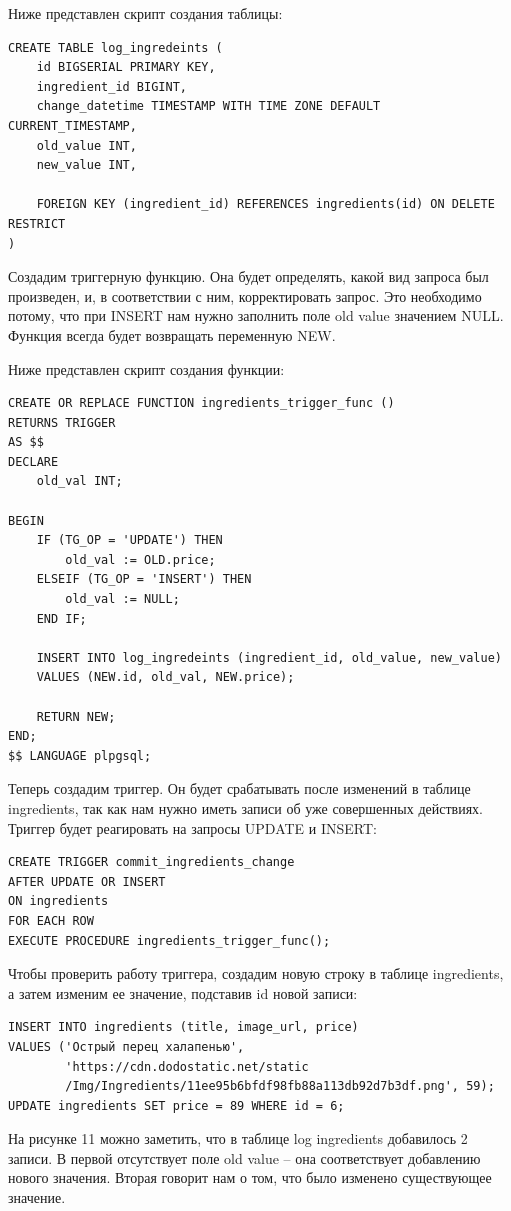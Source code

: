 \documentclass[a4paper,14pt]{extarticle}
\begin{document}
  Ниже представлен скрипт создания таблицы:
  
  \noindent
  \begin{Verbatim}[tabsize=4,fontsize=\small]
CREATE TABLE log_ingredeints (
    id BIGSERIAL PRIMARY KEY,
    ingredient_id BIGINT,
    change_datetime TIMESTAMP WITH TIME ZONE DEFAULT CURRENT_TIMESTAMP,
    old_value INT,
    new_value INT,

    FOREIGN KEY (ingredient_id) REFERENCES ingredients(id) ON DELETE RESTRICT
)
  \end{Verbatim}

  Создадим триггерную функцию. Она будет определять, какой вид запроса был произведен, и, в соответствии с ним, корректировать запрос. Это необходимо потому, что при INSERT нам нужно заполнить поле old value значением NULL. Функция всегда будет возвращать переменную NEW.

  Ниже представлен скрипт создания функции:

  \noindent
  \begin{Verbatim}[tabsize=4,fontsize=\small]
CREATE OR REPLACE FUNCTION ingredients_trigger_func ()
RETURNS TRIGGER
AS $$
DECLARE
    old_val INT;

BEGIN
    IF (TG_OP = 'UPDATE') THEN
        old_val := OLD.price;
    ELSEIF (TG_OP = 'INSERT') THEN
        old_val := NULL;
    END IF;

    INSERT INTO log_ingredeints (ingredient_id, old_value, new_value)
    VALUES (NEW.id, old_val, NEW.price);

    RETURN NEW;
END;
$$ LANGUAGE plpgsql;
  \end{Verbatim}

  Теперь создадим триггер. Он будет срабатывать после изменений в таблице ingredients, так как нам нужно иметь записи об уже совершенных действиях. Триггер будет реагировать на запросы UPDATE и INSERT:

  \noindent
  \begin{Verbatim}[tabsize=4,fontsize=\small]
CREATE TRIGGER commit_ingredients_change
AFTER UPDATE OR INSERT
ON ingredients
FOR EACH ROW
EXECUTE PROCEDURE ingredients_trigger_func();
  \end{Verbatim}

  Чтобы проверить работу триггера, создадим новую строку в таблице ingredients, а затем изменим ее значение, подставив id новой записи:

  \noindent
  \begin{Verbatim}[tabsize=4,fontsize=\small]
INSERT INTO ingredients (title, image_url, price)
VALUES ('Острый перец халапенью', 
        'https://cdn.dodostatic.net/static
        /Img/Ingredients/11ee95b6bfdf98fb88a113db92d7b3df.png', 59);
UPDATE ingredients SET price = 89 WHERE id = 6;
  \end{Verbatim}
  На рисунке 11 можно заметить, что в таблице log ingredients добавилось 2 записи. В первой отсутствует поле old value – она соответствует добавлению нового значения. Вторая говорит нам о том, что было изменено существующее значение.
\end{document}
